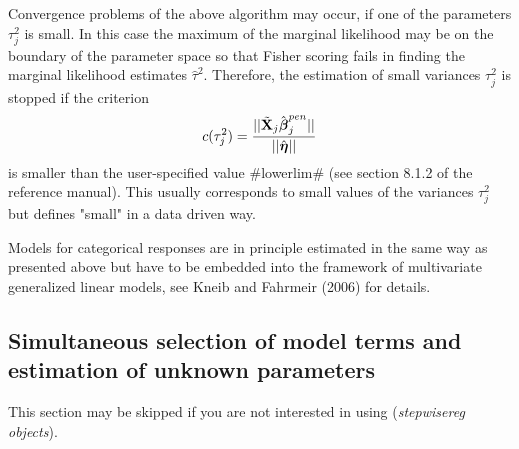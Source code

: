 \documentclass[11pt,a4paper,twoside]{bayesxarticle}
\begin{document}
Convergence problems of the above algorithm may occur, if one of the
parameters $\tau_j^2$ is small. In this case the maximum of the
marginal likelihood may be on the boundary of the parameter space so
that Fisher scoring fails in finding the marginal likelihood
estimates $\hat{\tau}^2$. Therefore, the estimation of small
variances $\tau_j^2$ is stopped if the criterion
\begin{equation}\label{remlstopcrit}
 c(\tau_j^2)=\frac{||\tilde{\Xvec}_j\hat{\betavec}_j^{pen}||}{||\hat{\etavec}||}
\end{equation}
is smaller than the user-specified value #lowerlim# (see section
8.1.2 of the reference manual). This usually corresponds to small
values of the variances $\tau_j^2$ but defines "small" in a data
driven way.

Models for categorical responses are in principle estimated in the
same way as presented above but have to be embedded into the
framework of multivariate generalized linear models, see Kneib and
Fahrmeir (2006) for details.

\subsection{Simultaneous selection of model terms and estimation of unknown parameters}
\label{stepwiseest}
 

This section may be skipped if you are not interested in using ({\em stepwisereg objects}).
\end{document}
